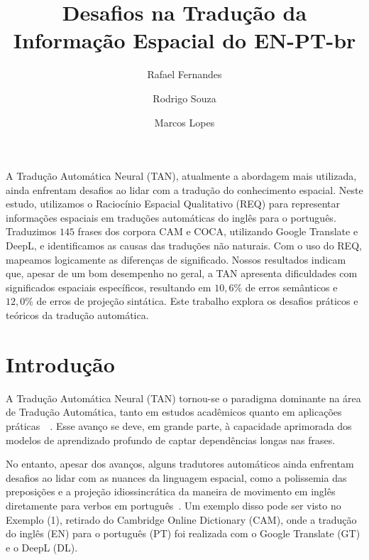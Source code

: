 \documentclass[a4paper, twocolumn, 11pt, twoside]{article}
\title{Desafios na Tradução da Informação Espacial do EN-PT-br}
\author{
  Rafael Fernandes
  \instituto{Universidade de São Paulo}
  \email{rafael.macario@usp.br} 
  \and 
  Rodrigo Souza
 \instituto{Universidade de São Paulo}
  \email{rodrigo.aparecido.souza@usp.br}
  \and
  Marcos Lopes
  \instituto{Universidade de São Paulo}
  \email{marcoslopes@usp.br}
  \and
}
\begin{document}
\maketitle

\begin{resumo}
  A Tradução Automática Neural (TAN), atualmente a abordagem mais utilizada, ainda enfrentam desafios ao lidar com a tradução do conhecimento espacial. Neste estudo, utilizamos o Raciocínio Espacial Qualitativo (REQ) para representar informações espaciais em traduções automáticas do inglês para o português. Traduzimos $145$ frases dos corpora CAM e COCA, utilizando Google Translate e DeepL, e identificamos as causas das traduções não naturais. Com o uso do REQ, mapeamos logicamente as diferenças de significado. Nossos resultados indicam que, apesar de um bom desempenho no geral, a TAN apresenta dificuldades com significados espaciais específicos, resultando em $10,6\%$ de erros semânticos e $12,0\%$ de erros de projeção sintática. Este trabalho explora os desafios práticos e teóricos da tradução automática.
\end{resumo}



\begin{abstract}
\end{abstract}



\section{Introdução}
A Tradução Automática Neural (TAN) tornou-se o paradigma dominante na área de Tradução Automática, tanto em estudos acadêmicos quanto em aplicações práticas~\citep{dabre2020survey}~\citep{vaswani2017attention, yang2020survey}. Esse avanço se deve, em grande parte, à capacidade aprimorada dos modelos de aprendizado profundo de captar dependências longas nas frases.

No entanto, apesar dos avanços, alguns tradutores automáticos ainda enfrentam desafios ao lidar com as nuances da linguagem espacial, como a polissemia das preposições e a projeção idiossincrática da maneira de movimento em inglês diretamente para verbos em português~\citep{}. Um exemplo disso pode ser visto no Exemplo (1), retirado do Cambridge Online Dictionary (CAM), onde a tradução do inglês (EN) para o português (PT) foi realizada com o Google Translate (GT) e o DeepL (DL).
\end{document}
